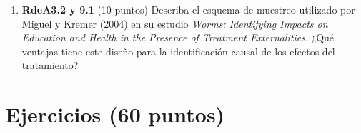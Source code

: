 \documentclass[10pt,a4paper]{article}
\begin{document}
\begin{enumerate}
\item \textbf{RdeA3.2 y 9.1} (10 puntos) Describa el esquema de muestreo utilizado por Miguel y Kremer (2004) en su estudio {\it Worms: Identifying Impacts on Education and Health in the Presence of Treatment Externalities}. ¿Qué ventajas tiene este diseño para la identificación causal de los efectos del tratamiento?\\

\end{enumerate}

\section{Ejercicios (60 puntos)}
\end{document}
